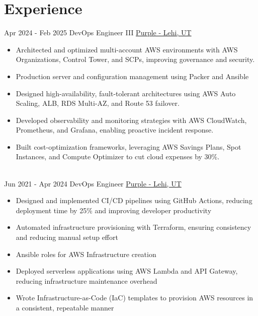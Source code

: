 \documentclass[letterpaper]{tenseconds} %
\begin{document}
\section{Experience}
\begin{twenty} %
	\twentyitem
	{Apr 2024 - }
	{Feb 2025}
	{DevOps Engineer III}
	{\href{https://purple.com/}{Purple - Lehi, UT}}
	{}
	{\begin{itemize}
		\item Architected and optimized multi-account AWS environments with AWS Organizations, Control Tower, and SCPs, improving governance and security.
		\item Production server and configuration management using Packer and Ansible
		\item Designed high-availability, fault-tolerant architectures using AWS Auto Scaling, ALB, RDS Multi-AZ, and Route 53 failover.
		\item Developed observability and monitoring strategies with AWS CloudWatch, Prometheus, and Grafana, enabling proactive incident response.
		\item Built cost-optimization frameworks, leveraging AWS Savings Plans, Spot Instances, and Compute Optimizer to cut cloud expenses by 30\%.
		\end{itemize}}
	\\
	\twentyitem
	{Jun 2021 -}
	{Apr 2024}
	{DevOps Engineer}
	{\href{https://purple.com/}{Purple - Lehi, UT}}
	{}
	{\begin{itemize}
    \item Designed and implemented CI/CD pipelines using GitHub Actions, reducing deployment time by 25\% and improving developer productivity
    \item Automated infrastructure provisioning with Terraform, ensuring consistency and reducing manual setup effort
		\item Ansible roles for AWS Infrastructure creation
		\item Deployed serverless applications using AWS Lambda and API Gateway, reducing infrastructure maintenance overhead
    \item Wrote Infrastructure-as-Code (IaC) templates to provision AWS resources in a consistent, repeatable manner
		\end{itemize}}
   \\

\end{twenty}
\end{document}
